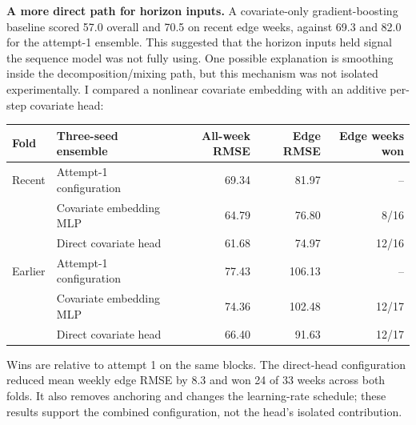 \textbf{A more direct path for horizon inputs.} A covariate-only gradient-boosting
baseline scored 57.0 overall and 70.5 on recent edge weeks, against 69.3 and 82.0 for
the attempt-1 ensemble. This suggested that the horizon inputs held signal the
sequence model was not fully using. One possible explanation is smoothing inside
the decomposition/mixing path, but this mechanism was not isolated experimentally.
I compared a nonlinear covariate embedding with an additive per-step covariate head:
\begin{center}\small
\begin{tabular}{llrrr}
\toprule
Fold & Three-seed ensemble & All-week RMSE & Edge RMSE & Edge weeks won\\
\midrule
Recent  & Attempt-1 configuration & 69.34 & 81.97 & --\\
        & Covariate embedding MLP & 64.79 & 76.80 & 8/16\\
        & Direct covariate head   & 61.68 & 74.97 & 12/16\\
Earlier & Attempt-1 configuration & 77.43 & 106.13 & --\\
        & Covariate embedding MLP & 74.36 & 102.48 & 12/17\\
        & Direct covariate head   & 66.40 & 91.63 & 12/17\\
\bottomrule
\end{tabular}
\end{center}
Wins are relative to attempt 1 on the same blocks. The direct-head configuration
reduced mean weekly edge RMSE by 8.3 and won 24 of 33 weeks across both folds.
It also removes anchoring and changes the learning-rate schedule; these results
support the combined configuration, not the head's isolated contribution.

